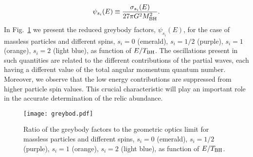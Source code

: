 \documentclass[aps,prd,reprint,twocolumn,preprintnumbers,floatfix,nofootinbib]{revtex4-1}
\newcommand{\TBH}{T_{\rm BH}}
\newcommand{\MBH}{M_{\rm BH}}
\begin{document}
\begin{align}
    \psi_{s_i}(E)\equiv\frac{\sigma_{s_i}(E)}{27\pi G^2\MBH^2}.
\end{align}
In Fig.~\ref{fig:greyb} we present the reduced greybody factors, $\psi_{s_i}(E)$, for the case of massless particles and different spins, $s_i=0$ (emerald), $s_i=1/2$ (purple), $s_i=1$ (orange), $s_i=2$ (light blue), as function of $E/\TBH$. The oscillations present in such quantities are related to the different contributions of the partial waves, each having a different value of the total angular momentum quantum number. Moreover, we observe that the low energy contributions are suppressed from higher particle spin values. This crucial characteristic will play an important role in the accurate determination of the relic abundance.
\begin{figure}[t!]
 \texttt{[image: greybod.pdf]}
 \caption{Ratio of the greybody factors to the geometric optics limit for massless particles and different spins, $s_i=0$ (\-e\-me\-rald),
 $s_i=1/2$ (purple), $s_i=1$ (orange), $s_i=2$ (light blue), as function of $E/\TBH$. \label{fig:greyb}}
\end{figure}
\end{document}
